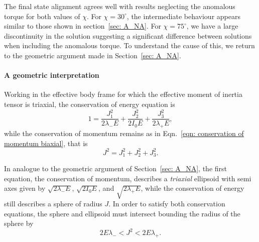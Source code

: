 \documentclass[../full_thesis/full_thesis.tex]{subfiles}
\begin{document}
The final state alignment agrees well with results neglecting the anomalous
torque for both values of $\chi$. For $\chi = 30^{\circ}$, the intermediate
behaviour appears similar to those shown in section~\ref{sec: A_NA}. For
$\chi=75^{\circ}$, we have a large discontinuity in the
solution suggesting a significant difference between solutions when including
the anomalous torque. To understand the cause of this, we return to the
geometric argument made in Section~\ref{sec: A_NA}.

\paragraph{A geometric interpretation}
Working in the effective body frame for which the effective moment of inertia
tensor is triaxial, the conservation of energy equation is
\begin{equation}
1 = \frac{J_{1}^{2}}{2\lambda_{-}E}+\frac{J_{2}^{2}}{2I_{0}E}+\frac{J_{3}^{2}}{2\lambda_{+}E},
\label{eqn: conservation of energy triaxial}
\end{equation}
while the conservation of momentum remains as in Eqn.~\eqref{eqn: conservation of momentum biaxial}, that is
\begin{equation}
J^{2}  =  J_{1}^{2}+J_{2}^{2}+J_{3}^{2}.
\label{eqn: conservation of mass triaxial}
\end{equation}

In analogue to the geometric argument of  Section~\ref{sec: A_NA}, the first equation,
the conservation of momentum, describes a \emph{triaxial} ellipsoid with semi axes
given by $\sqrt{2\lambda_{-}E}$, $\sqrt{2I_{0}E}$, and $\sqrt{2\lambda_{+}E}$, while
the conservation of energy still describes a sphere of radius $J$. In order to
satisfy both conservation equations, the sphere and ellipsoid must intersect
bounding the radius of the sphere by
\begin{equation}
2E\lambda_{-}<J^{2}<2E\lambda_{+}.
\end{equation}
\end{document}
